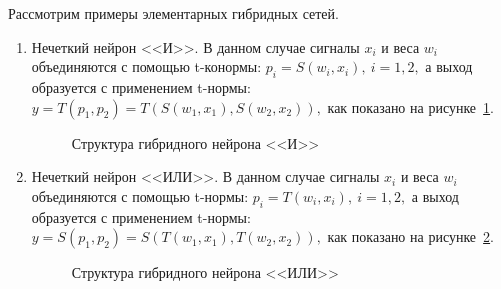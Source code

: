 Рассмотрим примеры элементарных гибридных сетей.
\begin{enumerate}
\item Нечеткий нейрон <<И>>.
  В данном случае сигналы \( x_i \) и веса \( w_i \) объединяются с помощью t-конормы:
  \( p_i = S(w_i, x_i), \: i = 1, 2, \)
  а выход образуется с применением t-нормы:
  \( y = T(p_1, p_2) = T(S(w_1, x_1), S(w_2, x_2)), \)
  как показано на рисунке~\ref{fig:hybrid_and}.

  \begin{figure}[h!]
    \centering
    \caption{Структура гибридного нейрона <<И>>}
    \label{fig:hybrid_and}
  \end{figure}

\item Нечеткий нейрон <<ИЛИ>>.
  В данном случае сигналы \( x_i \) и веса \( w_i \) объединяются с помощью t-нормы:
  \( p_i = T(w_i, x_i), \: i = 1, 2, \)
  а выход образуется с применением t-нормы:
  \( y = S(p_1, p_2) = S(T(w_1, x_1), T(w_2, x_2)), \)
  как показано на рисунке~\ref{fig:hybrid_or}.

  \begin{figure}[h!]
    \centering
    \caption{Структура гибридного нейрона <<ИЛИ>>}
    \label{fig:hybrid_or}
  \end{figure}
\end{enumerate}
